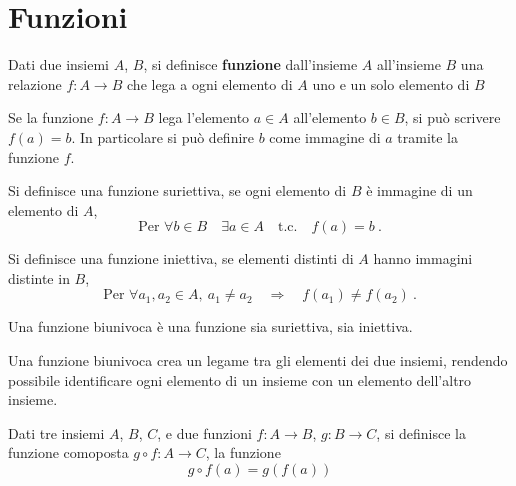 \section{Funzioni}
\begin{definition}[Funzione] Dati due insiemi $A$, $B$, si definisce \textbf{funzione} dall'insieme $A$ all'insieme $B$ una relazione $f: A \rightarrow B$ che lega a ogni elemento di $A$ uno e un solo elemento di $B$
\end{definition}
Se la funzione $f: A \rightarrow B$ lega l'elemento $a \in A$ all'elemento $b \in B$, si può scrivere $f(a) = b$. In particolare si può definire $b$ come immagine di $a$ tramite la funzione $f$.

\begin{definition} Si definisce una funzione suriettiva, se ogni elemento di $B$ è immagine di un elemento di $A$,
    \begin{equation}
        \text{Per }\forall b \in B \quad \exists a \in A \quad \text{t.c.} \quad f(a) = b \ .
    \end{equation}
\end{definition}

\begin{definition} Si definisce una funzione iniettiva, se elementi distinti di $A$ hanno immagini distinte in $B$,
    \begin{equation}
        \text{Per }\forall a_1, a_2 \in A, \ a_1 \neq a_2 \quad \Rightarrow \quad f(a_1) \neq f(a_2) \ .
    \end{equation}
\end{definition}

\begin{definition} Una funzione biunivoca è una funzione sia suriettiva, sia iniettiva.
\end{definition}
Una funzione biunivoca crea un legame  tra gli elementi dei due insiemi, rendendo possibile identificare ogni elemento di un insieme con un elemento dell'altro insieme.

\begin{definition} Dati tre insiemi $A$, $B$, $C$, e due funzioni $f: A \rightarrow  B$, $g: B \rightarrow C$, si definisce la funzione comoposta $g \circ f: A \rightarrow C$, la funzione
    \begin{equation}
        g \circ f (a) = g( f(a) )
    \end{equation}
\end{definition}

